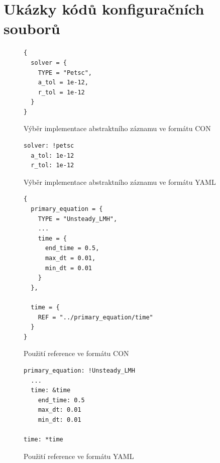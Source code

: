 \documentclass[FM,bw,DP]{tulthesis}
\begin{document}
\appendix
{}

\chapter{Ukázky kódů konfiguračních souborů}

\lstset{style=code}

\begin{figure}[h]
\begin{lstlisting}
{
  solver = {
    TYPE = "Petsc",
    a_tol = 1e-12,
    r_tol = 1e-12
  }
}
\end{lstlisting}
\vspace*{-20pt}
\caption{Výběr implementace abstraktního záznamu ve formátu CON}
\label{img:abstract-record-con}
\end{figure}

\begin{figure}[h]
\begin{lstlisting}
solver: !petsc
  a_tol: 1e-12
  r_tol: 1e-12
\end{lstlisting}
\vspace*{-20pt}
\caption{Výběr implementace abstraktního záznamu ve formátu YAML}
\label{img:abstract-record-yaml}
\end{figure}

\clearpage

\begin{figure}[h]
\begin{lstlisting}
{
  primary_equation = {
    TYPE = "Unsteady_LMH",
    ...
    time = {
      end_time = 0.5, 
      max_dt = 0.01,
      min_dt = 0.01
    }
  },
  
  time = {
    REF = "../primary_equation/time"
  }
}
\end{lstlisting}
\vspace*{-20pt}
\caption{Použití reference ve formátu CON}
\label{img:reference-con}
\end{figure}

\begin{figure}[h]
\begin{lstlisting}
primary_equation: !Unsteady_LMH
  ...
  time: &time
    end_time: 0.5
    max_dt: 0.01
    min_dt: 0.01

time: *time
\end{lstlisting}
\vspace*{-20pt}
\caption{Použití reference ve formátu YAML}
\label{img:reference-yaml}
\end{figure}
\end{document}
